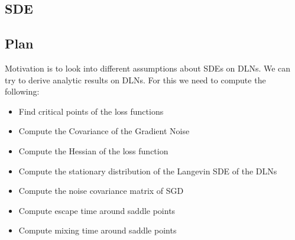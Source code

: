 \documentclass[11pt]{article}
\begin{document}
\subsection{SDE}

\subsection{Plan}
Motivation is to look into different assumptions about SDEs on DLNs. We can try to derive analytic results on DLNs. For this we need to compute the following:
\begin{itemize}
    \item Find critical points of the loss functions 
    \item Compute the Covariance of the Gradient Noise
    \item Compute the Hessian of the loss function
    \item Compute the stationary distribution of the Langevin SDE of the DLNs
    \item Compute the noise covariance matrix of SGD
    \item Compute escape time around saddle points 
    \item Compute mixing time around saddle points
\end{itemize}
\end{document}
